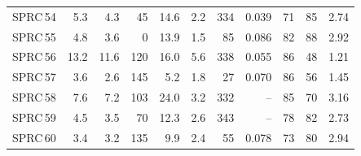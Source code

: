 \documentclass{ab}
\begin{document}
\begin{table}
\begin{tabular}{l|r|r|r|r|r|r|r|r|r|r}
 SPRC\,54&   5.3 &    4.3 &    45 &   14.6 &    2.2 &   334 &  0.039 &     71 &     85 &   2.74 \\
 SPRC\,55&   4.8 &    3.6 &     0 &   13.9 &    1.5 &    85 &  0.086 &     82 &     88 &   2.92 \\
 SPRC\,56&  13.2 &   11.6 &   120 &   16.0 &    5.6 &   338 &  0.055 &     86 &     48 &   1.21 \\
 SPRC\,57&   3.6 &    2.6 &   145 &    5.2 &    1.8 &    27 &  0.070 &     86 &     56 &   1.45 \\
 SPRC\,58&   7.6 &    7.2 &   103 &   24.0 &    3.2 &   332 &     -- &     85 &     70 &   3.16 \\
 SPRC\,59&   4.5 &    3.5 &    70 &   12.3 &    2.6 &   343 &     -- &     78 &     82 &   2.73 \\
 SPRC\,60&   3.4 &    3.2 &   135 &    9.9 &    2.4 &    55 &  0.078 &     73 &     80 &   2.94 \\
\hline
\end{tabular}
\end{table}


\setcounter{table}{0}
\end{document}
